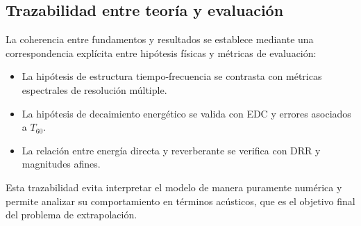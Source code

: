 \subsection{Trazabilidad entre teoría y evaluación}

La coherencia entre fundamentos y resultados se establece mediante una correspondencia explícita entre hipótesis físicas y métricas de evaluación:

\begin{itemize}
\item La hipótesis de estructura tiempo-frecuencia se contrasta con métricas espectrales de resolución múltiple.
\item La hipótesis de decaimiento energético se valida con EDC y errores asociados a $T_{60}$.
\item La relación entre energía directa y reverberante se verifica con DRR y magnitudes afines.
\end{itemize}

Esta trazabilidad evita interpretar el modelo de manera puramente numérica y permite analizar su comportamiento en términos acústicos, que es el objetivo final del problema de extrapolación. 

